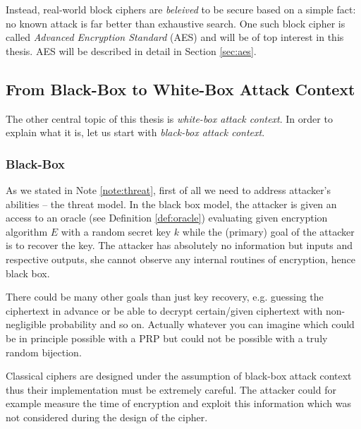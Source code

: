 Instead, real-world block ciphers are {\em beleived} to be secure based on a simple fact: no known attack is far better than exhaustive search. One such block cipher is called {\em Advanced Encryption Standard} (AES) and will be of top interest in this thesis. AES will be described in detail in Section \ref{sec:aes}.



\subsection{From Black-Box to White-Box Attack Context}
\label{sec:bbtowb}

The other central topic of this thesis is {\em white-box attack context}. In order to explain what it is, let us start with {\em black-box attack context}.

\subsubsection{Black-Box}

As we stated in Note \ref{note:threat}, first of all we need to address attacker's abilities -- the threat model. In the black box model, the attacker is given an access to an oracle (see Definition \ref{def:oracle}) evaluating given encryption algorithm $E$ with a random secret key $k$ while the (primary) goal of the attacker is to recover the key. The attacker has absolutely no information but inputs and respective outputs, she cannot observe any internal routines of encryption, hence black box.

\begin{note}
	There could be many other goals than just key recovery, e.g. guessing the ciphertext in advance or be able to decrypt certain/given ciphertext with non-negligible probability and so on. Actually whatever you can imagine which could be in principle possible with a PRP but could not be possible with a truly random bijection.
\end{note}

Classical ciphers are designed under the assumption of black-box attack context thus their implementation must be extremely careful. The attacker could for example measure the time of encryption and exploit this information which was not considered during the design of the cipher.


